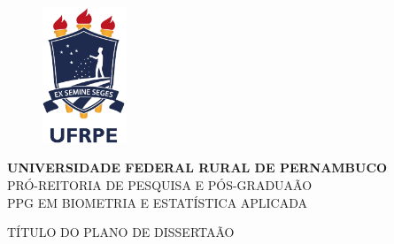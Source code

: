 \begin{titlepage}
\begin{figure}[t]
\centering
    \includegraphics[width=2.5cm]{prefacios/capa/figuras/ufrpe}\\
	\label{fig:pdsmodel}
\end{figure}


\begin{center}
\vspace{1.0truecm}
\large{\textbf{UNIVERSIDADE FEDERAL RURAL DE PERNAMBUCO}}\\
\large{PR\'{O}-REITORIA DE PESQUISA E P\'{O}S-GRADUA\~{A}O}\\
\large{PPG EM BIOMETRIA E ESTAT\'{I}STICA APLICADA}
\end{center}


\begin{center}
\vspace{5truecm}
\large{{T\'{I}TULO DO PLANO DE DISSERTA\~{A}O}}
\end{center}

\vspace{5.0truecm}

\begin{center}
\vspace{3truecm}
\end{center}

\end{titlepage}
\pagebreak
